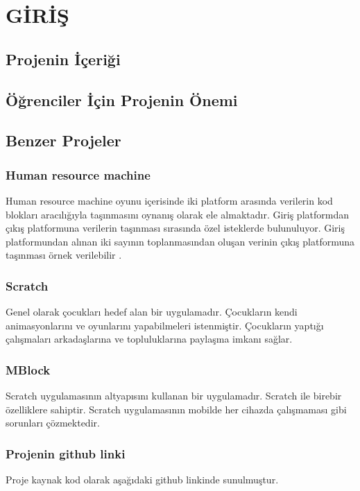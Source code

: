 \section{GİRİŞ}


\subsection{Projenin İçeriği}



\subsection{Öğrenciler İçin Projenin Önemi}


\subsection{Benzer Projeler}




\subsubsection{Human resource machine}
Human resource machine oyunu içerisinde iki platform arasında verilerin kod blokları aracılığıyla taşınmasını oynanış olarak ele almaktadır. Giriş platformdan çıkış platformuna verilerin taşınması sırasında özel isteklerde bulunuluyor.  Giriş platformundan alınan iki sayının toplanmasından oluşan verinin çıkış platformuna taşınması örnek verilebilir \cite{k1}.



\subsubsection{Scratch}
Genel olarak çocukları hedef alan bir uygulamadır. Çocukların kendi animasyonlarını ve oyunlarını yapabilmeleri istenmiştir. Çocukların yaptığı çalışmaları arkadaşlarına ve topluluklarına paylaşma imkanı sağlar.

\subsubsection{MBlock}
Scratch uygulamasının altyapısını kullanan bir uygulamadır. Scratch ile birebir özelliklere sahiptir. Scratch uygulamasının mobilde her cihazda çalışmaması gibi sorunları çözmektedir.

\subsubsection{Projenin github linki}
Proje kaynak kod olarak aşağıdaki github linkinde sunulmuştur.
